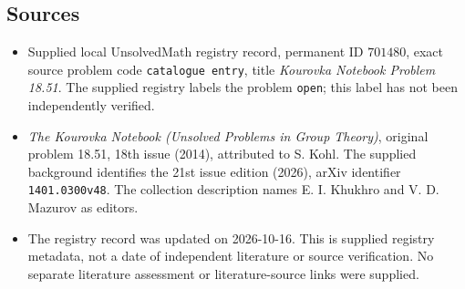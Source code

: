 \documentclass[11pt]{article}
\begin{document}
\subsection{Sources}
\begin{itemize}
\item Supplied local UnsolvedMath registry record, permanent ID \(701480\), exact source problem code \texttt{catalogue entry}, title \emph{Kourovka Notebook Problem 18.51}. The supplied registry labels the problem \texttt{open}; this label has not been independently verified.
\item \emph{The Kourovka Notebook (Unsolved Problems in Group Theory)}, original problem 18.51, 18th issue (2014), attributed to S. Kohl. The supplied background identifies the 21st issue edition (2026), arXiv identifier \texttt{1401.0300v48}. The collection description names E. I. Khukhro and V. D. Mazurov as editors.
\item The registry record was updated on 2026-10-16. This is supplied registry metadata, not a date of independent literature or source verification. No separate literature assessment or literature-source links were supplied.
\end{itemize}
\end{document}
